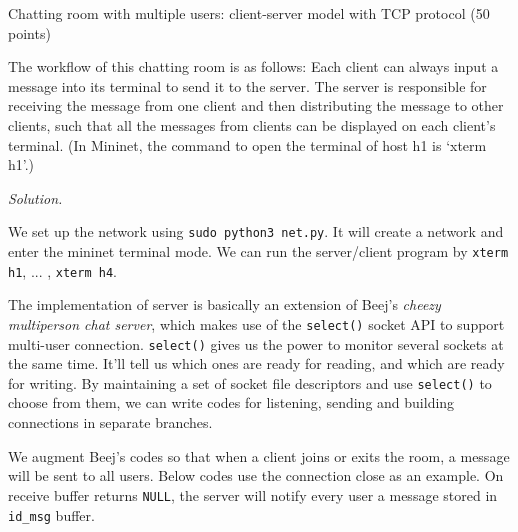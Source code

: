 \begin{exercise}[]{Chatting room with multiple users: client-server model with TCP protocol (50 points)

  The workflow of this chatting room is as follows: Each client can always input a message into its terminal to send it to the server. The server is responsible for receiving the message from one client and then distributing the message to other clients, such that all the messages from clients can be displayed on each client’s terminal. (In Mininet, the command to open the terminal of host h1 is ‘xterm h1’.)
    }

\noindent\emph{Solution.}

  We set up the network using \texttt{sudo python3 net.py}. It will create a network and enter the mininet terminal mode. We can run the server/client program by \texttt{xterm h1}, ... , \texttt{xterm h4}.
  
  The implementation of server is basically an extension of Beej's \emph{cheezy multiperson chat server}, which makes use of the \texttt{select()} socket API to support multi-user connection. \texttt{select()} gives us the power to monitor several sockets at the same time. It’ll tell us which ones are ready for reading, and which are ready for writing. By maintaining a set of socket file descriptors and use \texttt{select()} to choose from them, we can write codes for listening, sending and building connections in separate branches.

  We augment Beej's codes so that when a client joins or exits the room, a message will be sent to all users. Below codes use the connection close as an example. On receive buffer returns \texttt{NULL}, the server will notify every user a message stored in \texttt{id\_msg} buffer.


\end{exercise}
